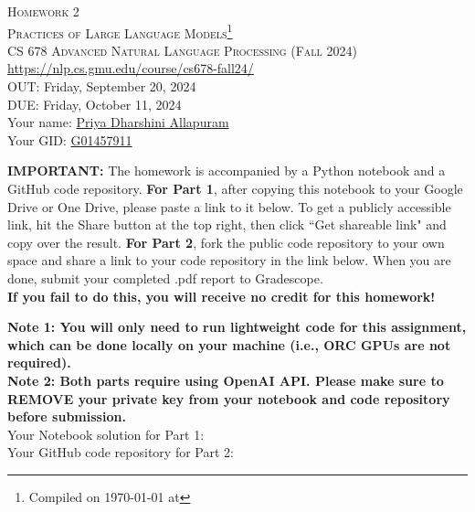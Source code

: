 \documentclass[11pt,addpoints,answers]{exam}
\title{\textsc{\hwName}} %
\author{}
\date{}
\date{}
\newcommand{\courseNum}{CS 678}
\newcommand{\courseName}{Advanced Natural Language Processing}
\newcommand{\courseSem}{Fall 2024}
\newcommand{\courseUrl}{\url{https://nlp.cs.gmu.edu/course/cs678-fall24/}}
\newcommand{\hwNum}{Homework 2}
\newcommand{\hwTopic}{Practices of Large Language Models}
\newcommand{\outDate}{Friday, September 20, 2024}
\newcommand{\dueDate}{Friday, October 11, 2024}
\begin{document}
\section*{}
\begin{center}
  \textsc{\LARGE \hwNum} \\[1em]
  \textsc{\LARGE \hwTopic\footnote{Compiled on \today{} at \currenttime{}}} \\
  \vspace{1em}
  \textsc{\large \courseNum{} \courseName{} (\courseSem)} \\
  \courseUrl\\
  \vspace{1em}
  OUT: \outDate \\
  DUE: \dueDate \\[2em]
  
  Your name: \underline{Priya Dharshini Allapuram}\\[2em]
  Your GID: \underline{G01457911}\\[2em]
\end{center}

  \textbf{IMPORTANT:} The homework is accompanied by a Python notebook and a GitHub code repository. 
  \textbf{For Part 1}, after copying this notebook to your Google Drive or One Drive, please paste a link to it below. To get a publicly accessible link, hit the Share button at the top right, then click ``Get shareable link" and copy over the result. 
  \textbf{For Part 2}, fork the public code repository to your own space and share a link to your code repository in the link below.
  When you are done, submit your completed .pdf report to Gradescope.\\
  \textbf{If you fail to do this, you will receive no credit for this homework!}\\

\begin{center}
  \textbf{Note 1: You will only need to run lightweight code for this assignment, which can be done locally on your machine (i.e., ORC GPUs are not required).}\\
  \textbf{Note 2: Both parts require using OpenAI API. Please make sure to REMOVE your private key from your notebook and code repository before submission.}\\[1em]
  Your Notebook solution for Part 1: \underline{\hspace{5.2cm}}\\[1em]
  Your GitHub code repository for Part 2: \underline{\hspace{5.2cm}}\\[2em]
\end{center}
\end{document}
